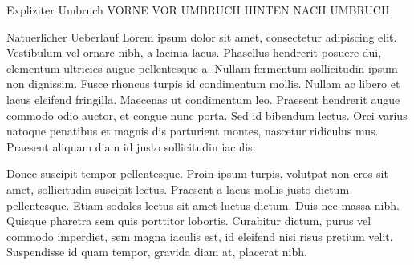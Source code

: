 \documentclass{pnpcards}
\begin{document}
\begin{card}{Expliziter Umbruch}
VORNE VOR UMBRUCH
\newpage
HINTEN NACH UMBRUCH
\end{card}

\begin{card}{Natuerlicher Ueberlauf}
Lorem ipsum dolor sit amet, consectetur adipiscing elit. Vestibulum vel ornare nibh, a lacinia lacus. Phasellus hendrerit posuere dui, elementum ultricies augue pellentesque a. Nullam fermentum sollicitudin ipsum non dignissim. Fusce rhoncus turpis id condimentum mollis. Nullam ac libero et lacus eleifend fringilla. Maecenas ut condimentum leo. Praesent hendrerit augue commodo odio auctor, et congue nunc porta. Sed id bibendum lectus. Orci varius natoque penatibus et magnis dis parturient montes, nascetur ridiculus mus. Praesent aliquam diam id justo sollicitudin iaculis.

Donec suscipit tempor pellentesque. Proin ipsum turpis, volutpat non eros sit amet, sollicitudin suscipit lectus. Praesent a lacus mollis justo dictum pellentesque. Etiam sodales lectus sit amet luctus dictum. Duis nec massa nibh. Quisque pharetra sem quis porttitor lobortis. Curabitur dictum, purus vel commodo imperdiet, sem magna iaculis est, id eleifend nisi risus pretium velit. Suspendisse id quam tempor, gravida diam at, placerat nibh.
\end{card}
\end{document}
